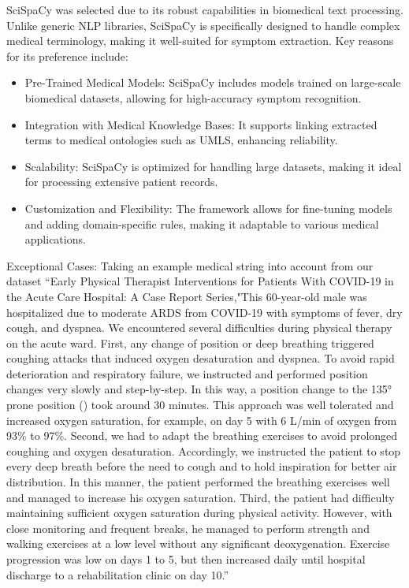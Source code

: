 SciSpaCy was selected due to its robust capabilities in biomedical text processing. Unlike generic NLP libraries, SciSpaCy is specifically designed to handle complex medical terminology, making it well-suited for symptom extraction. Key reasons for its preference include:
\begin{itemize}
    \item Pre-Trained Medical Models: SciSpaCy includes models trained on large-scale biomedical datasets, allowing for high-accuracy symptom recognition.
    \item Integration with Medical Knowledge Bases: It supports linking extracted terms to medical ontologies such as UMLS, enhancing reliability.
    \item Scalability: SciSpaCy is optimized for handling large datasets, making it ideal for processing extensive patient records.
    \item Customization and Flexibility: The framework allows for fine-tuning models and adding domain-specific rules, making it adaptable to various medical applications.
\end{itemize}
Exceptional Cases: Taking an example medical string into account from our dataset 
“Early Physical Therapist Interventions for Patients With COVID-19 in the Acute Care Hospital: A Case Report Series,"This 60-year-old male was hospitalized due to moderate ARDS from COVID-19 with symptoms of fever, dry cough, and dyspnea. We encountered several difficulties during physical therapy on the acute ward. First, any change of position or deep breathing triggered coughing attacks that induced oxygen desaturation and dyspnea. To avoid rapid deterioration and respiratory failure, we instructed and performed position changes very slowly and step-by-step. In this way, a position change to the 135° prone position () took around 30 minutes. This approach was well tolerated and increased oxygen saturation, for example, on day 5 with 6 L/min of oxygen from 93\% to 97\%. Second, we had to adapt the breathing exercises to avoid prolonged coughing and oxygen desaturation. Accordingly, we instructed the patient to stop every deep breath before the need to cough and to hold inspiration for better air distribution. In this manner, the patient performed the breathing exercises well and managed to increase his oxygen saturation. Third, the patient had difficulty maintaining sufficient oxygen saturation during physical activity. However, with close monitoring and frequent breaks, he managed to perform strength and walking exercises at a low level without any significant deoxygenation. Exercise progression was low on days 1 to 5, but then increased daily until hospital discharge to a rehabilitation clinic on day 10.”

